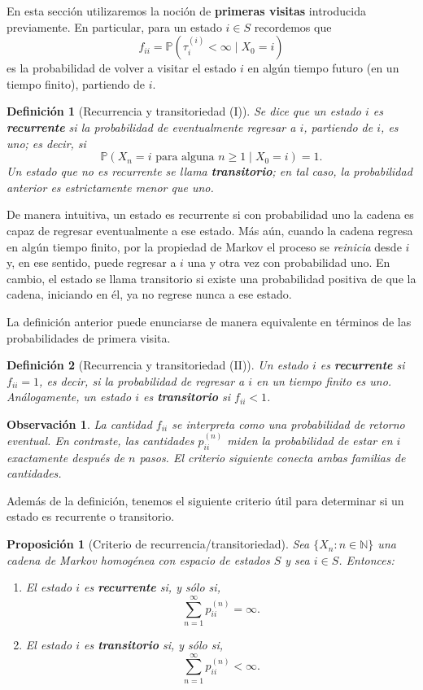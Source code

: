 \documentclass[12pt]{book}
\newtheorem{definition}{Definición}[chapter]
\newtheorem{proposition}{Proposición}[chapter]
\newtheorem{remark}{Observación}[chapter]
\begin{document}
En esta sección utilizaremos la noción de \textbf{primeras visitas} introducida previamente. En particular, para un estado $i \in S$ recordemos que
\[
f_{ii} = \mathbb{P}(\tau_i^{(i)} < \infty \mid X_0 = i)
\]
es la probabilidad de volver a visitar el estado $i$ en algún tiempo futuro (en un tiempo finito), partiendo de $i$.


\begin{definition}[Recurrencia y transitoriedad (I)]
Se dice que un estado $i$ es \textbf{recurrente} si la probabilidad de eventualmente regresar a $i$, partiendo de $i$, es uno; es decir, si
\[
\mathbb{P}(X_n = i \text{ para alguna } n \geq 1 \mid X_0 = i) = 1.
\]
Un estado que no es recurrente se llama \textbf{transitorio}; en tal caso, la probabilidad anterior es estrictamente menor que uno.
\end{definition}

De manera intuitiva, un estado es recurrente si con probabilidad uno la cadena es capaz de regresar eventualmente a ese estado. Más aún, cuando la cadena regresa en algún tiempo finito, por la propiedad de Markov el proceso se \emph{reinicia} desde $i$ y, en ese sentido, puede regresar a $i$ una y otra vez con probabilidad uno. En cambio, el estado se llama transitorio si existe una probabilidad positiva de que la cadena, iniciando en él, ya no regrese nunca a ese estado.

La definición anterior puede enunciarse de manera equivalente en términos de las probabilidades de primera visita.

\begin{definition}[Recurrencia y transitoriedad (II)]
Un estado $i$ es \textbf{recurrente} si $f_{ii} = 1$, es decir, si la probabilidad de regresar a $i$ en un tiempo finito es uno. Análogamente, un estado $i$ es \textbf{transitorio} si $f_{ii} < 1$.
\end{definition}

\begin{remark}
La cantidad $f_{ii}$ se interpreta como una probabilidad de retorno \emph{eventual}. En contraste, las cantidades $p_{ii}^{(n)}$ miden la probabilidad de estar en $i$ \emph{exactamente} después de $n$ pasos. El criterio siguiente conecta ambas familias de cantidades.
\end{remark}

Además de la definición, tenemos el siguiente criterio útil para determinar si un estado es recurrente o transitorio.

\begin{proposition}[Criterio de recurrencia/transitoriedad]
Sea $\{X_n : n \in \mathbb{N}\}$ una cadena de Markov homogénea con espacio de estados $S$ y sea $i \in S$. Entonces:
\begin{enumerate}
    \item[(a)] El estado $i$ es \textbf{recurrente} si, y sólo si,
    \[
    \sum_{n=1}^{\infty} p_{ii}^{(n)} = \infty.
    \]
    \item[(b)] El estado $i$ es \textbf{transitorio} si, y sólo si,
    \[
    \sum_{n=1}^{\infty} p_{ii}^{(n)} < \infty.
    \]
\end{enumerate}
\end{proposition}
\end{document}
